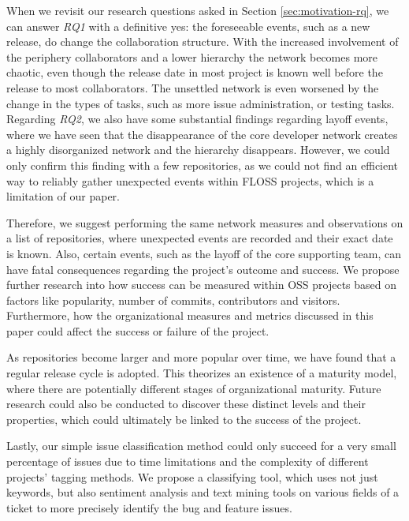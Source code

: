 When we revisit our research questions asked in Section \ref{sec:motivation-rq}, we can answer \textit{RQ1} with a definitive yes: the foreseeable events, such as a new release, do change the collaboration structure. With the increased involvement of the periphery collaborators and a lower hierarchy the network becomes more chaotic, even though the release date in most project is known well before the release to most collaborators. The unsettled network is even worsened by the change in the types of tasks, such as more issue administration, or testing tasks. Regarding \textit{RQ2}, we also have some substantial findings regarding layoff events, where we have seen that the disappearance of the core developer network creates a highly disorganized network and the hierarchy disappears. However, we could only confirm this finding with a few repositories, as we could not find an efficient way to reliably gather unexpected events within FLOSS projects, which is a limitation of our paper.

Therefore, we suggest performing the same network measures and observations on a list of repositories, where unexpected events are recorded and their exact date is known. Also, certain events, such as the layoff of the core supporting team, can have fatal consequences regarding the project's outcome and success. We propose further research into how success can be measured within OSS projects based on factors like popularity, number of commits, contributors and visitors. Furthermore, how the organizational measures and metrics discussed in this paper could affect the success or failure of the project.

As repositories become larger and more popular over time, we have found that a regular release cycle is adopted. This theorizes an existence of a maturity model, where there are potentially different stages of organizational maturity. Future research could also be conducted to discover these distinct levels and their properties, which could ultimately be linked to the success of the project.

Lastly, our simple issue classification method could only succeed for a very small percentage of issues due to time limitations and the complexity of different projects' tagging methods. We propose a classifying tool, which uses not just keywords, but also sentiment analysis and text mining tools on various fields of a ticket to more precisely identify the bug and feature issues.

